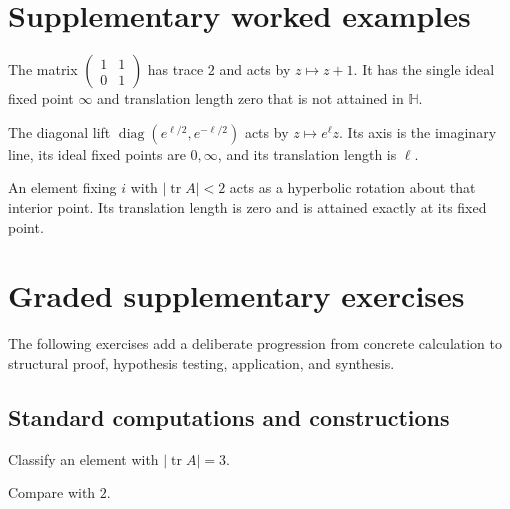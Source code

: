 \section{Supplementary worked examples}
\label{sec:vii34-pedagogy}

\begin{example}\label{ex:vii34-ped-01}
The matrix \(\begin{pmatrix}1&1\\0&1\end{pmatrix}\) has trace \(2\) and acts by \(z\mapsto z+1\).  It has the single ideal fixed point \(\infty\) and translation length zero that is not attained in \(\mathbb H\).
\end{example}

\begin{example}\label{ex:vii34-ped-02}
The diagonal lift \(\operatorname{diag}(e^{\ell/2},e^{-\ell/2})\) acts by \(z\mapsto e^\ell z\).  Its axis is the imaginary line, its ideal fixed points are \(0,\infty\), and its translation length is \(\ell\).
\end{example}

\begin{example}\label{ex:vii34-ped-03}
An element fixing \(i\) with \(|\operatorname{tr}A|<2\) acts as a hyperbolic rotation about that interior point.  Its translation length is zero and is attained exactly at its fixed point.
\end{example}

\section{Graded supplementary exercises}
The following exercises add a deliberate progression from concrete calculation to structural proof, hypothesis testing, application, and synthesis.

\subsection*{Standard computations and constructions}

\begin{exercise}\label{exr:vii34-ped-01}
Classify an element with \(|\operatorname{tr}A|=3\).
\end{exercise}

\begin{hint}
Compare with \(2\).
\end{hint}

